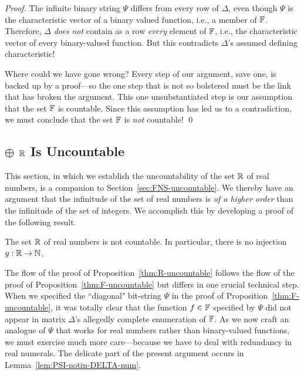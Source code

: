 \begin{proof}
The infinite binary string $\Psi$ differs from every row of $\Delta$, even though $\Psi$ is the characteristic vector of a binary valued function, i.e., a member of $\mathbb{F}$.  Therefore, $\Delta$ {\em does not} contain as a row {\em every} element of $\mathbb{F}$, i.e., the characteristic vector of every binary-valued function.  But this contradicts $\Delta$'s assumed defining characteristic!

\smallskip

Where could we have gone wrong?  Every step of our argument, save one, is backed up by a proof---so the one step that is not so bolstered must be the link that has broken the argument.  This one unsubstantiated step is our assumption that the set $\mathbb{F}$ is countable. Since this assumption has led us to a contradiction, we must conclude that the set $\mathbb{F}$ is {\em not} countable!  \qed
\end{proof}

\subsection{$\oplus$ $\mathbb{R}$ Is Uncountable}
\label{sec:R-uncountable}
\label{sec:Reals-uncountable}


This section, in which we establish the uncountability of the set $\mathbb{R}$ of real numbers, is a companion to Section~\ref{sec:FNS-uncountable}.  We thereby have an argument that the infinitude of the set of real numbers is {\em of a higher order} than the infinitude of the set of integers.  We accomplish this by developing a proof of the following result.

\begin{prop}
\label{thm:R-uncountable}
The set $\mathbb{R}$ of real numbers is not countable.  In particular, there is no injection $g: \mathbb{R} \rightarrow \mathbb{N}$.
\end{prop}

\smallskip

The flow of the proof of Proposition~\ref{thm:R-uncountable} follows the flow of the proof of Proposition~\ref{thm:F-uncountable} but differs in one crucial technical step.  When we specified the ``diagonal" bit-string $\Psi$ in the proof of Proposition~\ref{thm:F-uncountable}, it was totally clear that the function $f \in \mathbb{F}$ specified by $\Psi$ did not appear in matrix $\Delta$'s  allegedly complete enumeration of $\mathbb{F}$.  As we now craft an analogue of $\Psi$ that works for real numbers rather than binary-valued functions, we must exercise much more care---because we have to deal with redundancy in real numerals.  The delicate part of the present argument occurs in Lemma~\ref{lem:PSI-notin-DELTA-num}.

